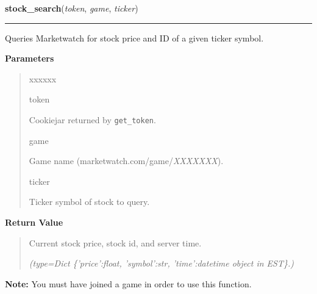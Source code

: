 \hspace{.8\funcindent}\begin{boxedminipage}{\funcwidth}

    \raggedright \textbf{stock\_search}(\textit{token}, \textit{game}, \textit{ticker})

    \vspace{-1.5ex}

    \rule{\textwidth}{0.5\fboxrule}
\setlength{\parskip}{2ex}
    Queries Marketwatch for stock price and ID of a given ticker symbol.

\setlength{\parskip}{1ex}
      \textbf{Parameters}
      \vspace{-1ex}

      \begin{quote}
        \begin{Ventry}{xxxxxx}

          \item[token]

          Cookiejar returned by \texttt{get\_token}.

          \item[game]

          Game name (marketwatch.com/game/\textit{XXXXXXX}).

          \item[ticker]

          Ticker symbol of stock to query.

        \end{Ventry}

      \end{quote}

      \textbf{Return Value}
    \vspace{-1ex}

      \begin{quote}
      Current stock price, stock id, and server time.

      {\it (type=Dict \{'price':float, 'symbol':str, 'time':\textit{datetime} object 
      in EST\}.)}

      \end{quote}

\textbf{Note:} You must have joined a game in order to use this function.



    \end{boxedminipage}



